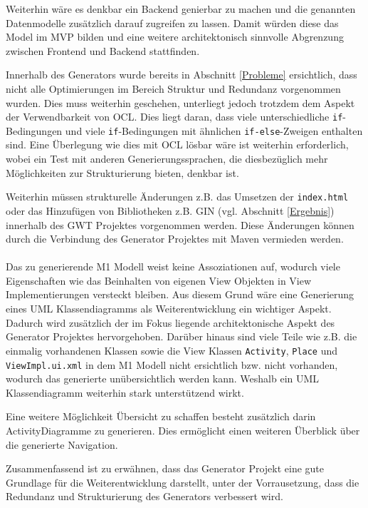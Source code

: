 Weiterhin wäre es denkbar ein Backend genierbar zu machen und die
genannten Datenmodelle zusätzlich darauf zugreifen zu lassen. Damit würden
diese das Model im MVP bilden und eine weitere architektonisch sinnvolle Abgrenzung zwischen Frontend
und Backend stattfinden.

Innerhalb des Generators wurde bereits in Abschnitt \ref{Probleme} ersichtlich,
dass nicht alle Optimierungen im Bereich Struktur und Redundanz vorgenommen wurden.
Dies muss weiterhin geschehen, unterliegt jedoch trotzdem dem Aspekt der
Verwendbarkeit von OCL. Dies liegt daran, dass viele
unterschiedliche \texttt{if}-Bedingungen und viele \texttt{if}-Bedingungen mit
ähnlichen \texttt{if-else}-Zweigen enthalten sind. Eine Überlegung wie dies mit
OCL lösbar wäre ist weiterhin erforderlich, wobei ein Test mit anderen Generierungssprachen,
die diesbezüglich mehr Möglichkeiten zur Strukturierung bieten, denkbar ist.

Weiterhin müssen strukturelle Änderungen z.B. das Umsetzen der
\texttt{index.html} oder das Hinzufügen von Bibliotheken z.B. GIN (vgl.
Abschnitt \ref{Ergebnis}) innerhalb des GWT Projektes vorgenommen werden. Diese
Änderungen können durch die Verbindung des Generator Projektes mit Maven vermieden werden.
\\\\
Das zu generierende M1 Modell weist keine Assoziationen auf, wodurch viele
Eigenschaften wie das Beinhalten von eigenen View Objekten in View
Implementierungen versteckt bleiben. Aus diesem Grund wäre eine Generierung
eines UML Klassendiagramms als Weiterentwicklung ein wichtiger Aspekt. Dadurch wird zusätzlich der im Fokus
liegende architektonische Aspekt des Generator Projektes hervorgehoben.
Darüber hinaus sind viele Teile wie z.B. die einmalig vorhandenen Klassen sowie die View
Klassen \texttt{Activity}, \texttt{Place} und \texttt{ViewImpl.ui.xml} in
dem M1 Modell nicht ersichtlich bzw. nicht vorhanden, wodurch das generierte
unübersichtlich werden kann. Weshalb ein UML Klassendiagramm weiterhin stark unterstützend wirkt. 

Eine weitere Möglichkeit Übersicht zu schaffen besteht zusätzlich darin
ActivityDiagramme zu generieren. Dies ermöglicht einen weiteren Überblick über
die generierte Navigation.

Zusammenfassend ist zu erwähnen, dass das Generator Projekt eine gute
Grundlage für die Weiterentwicklung darstellt, unter der Vorrausetzung, dass die
Redundanz und Strukturierung des Generators verbessert wird.
